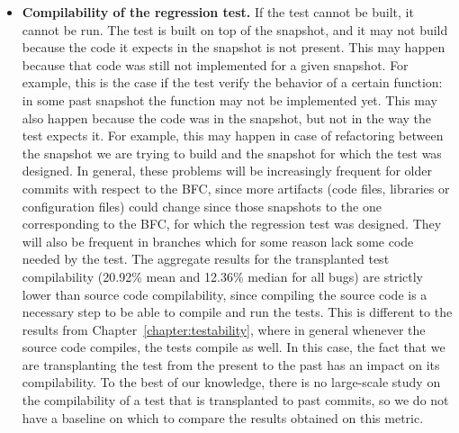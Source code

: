 \begin{itemize}
\item \textbf{Compilability of the regression test.} If the test cannot be built, it cannot be run. The test is built on top of the snapshot, and it may not build because the code it expects in the snapshot is not present. This may happen because that code was still not implemented for a given snapshot. For example, this is the case if the test verify the behavior of a certain function: in some past snapshot the function may not be implemented yet. This may also happen because the code was in the snapshot, but not in the way the test expects it. For example, this may happen in case of refactoring between the snapshot we are trying to build and the snapshot for which the test was designed. In general, these problems will be increasingly frequent for older commits with respect to the BFC, since more artifacts (code files, libraries or configuration files) could change since those snapshots to the one corresponding to the BFC, for which the regression test was designed. They will also be frequent in branches which for some reason lack some code needed by the test.
The aggregate results for the transplanted test compilability (20.92\% mean and 12.36\% median for all bugs) are strictly lower than source code compilability, since compiling the source code is a necessary step to be able to compile and run the tests. 
This is different to the results from Chapter~\ref{chapter:testability}, where in general whenever the source code compiles, the tests compile as well. 
In this case, the fact that we are transplanting the test from the present to the past has an impact on its compilability.
To the best of our knowledge, there is no large-scale study on the compilability of a test that is transplanted to past commits, so we do not have a baseline on which to compare the results obtained on this metric.
\\


\end{itemize}
